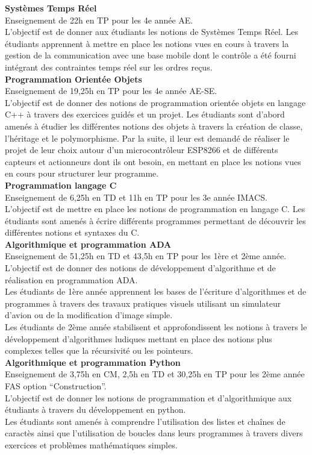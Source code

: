 \documentclass[11pt,a4paper,sans]{moderncv}         %
\begin{document}
{
  \textbf{Syst\`emes Temps R\'eel}\\
  Enseignement de 22h en TP pour les 4e ann\'ee AE.\\
  L'objectif est de donner aux \'etudiants les notions de Syst\`emes Temps R\'eel.
  Les \'etudiants apprennent \`a mettre en place les notions vues en cours \`a travers la gestion de la communication avec une base mobile dont le contr\^ole a \'et\'e fourni int\'egrant des contraintes temps r\'eel sur les ordres re\c cus.\\
  \textbf{Programmation Orient\'ee Objets}\\
  Enseignement de 19,25h en TP pour les 4e ann\'ee AE-SE.\\
  L'objectif est de donner des notions de programmation orient\'ee objets en langage C++ \`a travers des exercices guid\'es et un projet.
  Les \'etudiants sont d'abord amen\'es \`a \'etudier les diff\'erentes notions des objets \`a travers la cr\'eation de classe, l'h\'eritage et le polymorphisme.
  Par la suite, il leur est demand\'e de r\'ealiser le projet de leur choix autour d'un microcontr\^oleur ESP8266 et de diff\'erents capteurs et actionneurs dont ils ont besoin, en mettant en place les notions vues en cours pour structurer leur programme.\\
  \textbf{Programmation langage C}\\
  Enseignement de 6,25h en TD et 11h en TP pour les 3e ann\'ee IMACS.\\
  L'objectif est de mettre en place les notions de programmation en langage C.
  Les \'etudiants sont amen\'es \`a \'ecrire diff\'erents programmes permettant de d\'ecouvrir les diff\'erentes notions et syntaxes du C.\\
  \textbf{Algorithmique et programmation ADA}\\
  Enseignement de 51,25h en TD et 43,5h en TP pour les 1\`ere et 2\`eme ann\'ee.\\
  L'objectif est de donner des notions de d\'eveloppement d'algorithme et de r\'ealisation en programmation ADA.\\
  Les \'etudiants de 1\`ere ann\'ee apprennent les bases de l'\'ecriture d'algorithmes et de programmes \`a travers des travaux pratiques visuels utilisant un simulateur d'avion ou de la modification d'image simple.\\
  Les \'etudiants de 2\`eme ann\'ee stabilisent et approfondissent les notions \`a travers le d\'eveloppement d'algorithmes ludiques mettant en place des notions plus complexes telles que la r\'ecursivit\'e ou les pointeurs.\\
  \textbf{Algorithmique et programmation Python}\\
  Enseignement de 3,75h en CM, 2,5h en TD et 30,25h en TP pour les 2\`eme ann\'ee FAS option ``Construction''.\\
  L'objectif est de donner les notions de programmation et d'algorithmique aux \'etudiants \`a travers du d\'eveloppement en python.\\
  Les \'etudiants sont amen\'es \`a comprendre l'utilisation des listes et cha\^ines de caract\`es ainsi que l'utilisation de boucles dans leurs programmes \`a travers divers exercices et probl\`emes math\'ematiques simples.\\
}
\end{document}
